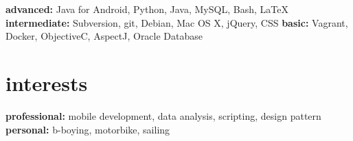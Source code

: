 \documentclass[]{friggeri-cv} %
\begin{document}
\textbf{advanced:} Java for Android, Python, Java, MySQL, Bash, \LaTeX{} \textbf{intermediate:} Subversion, git, Debian, Mac OS X, jQuery, CSS \textbf{basic:} Vagrant, Docker, ObjectiveC, AspectJ, Oracle Database


\section{interests}

\textbf{professional:} mobile development, data analysis, scripting, design pattern \textbf{personal:} b-boying, motorbike, sailing
\end{document}
